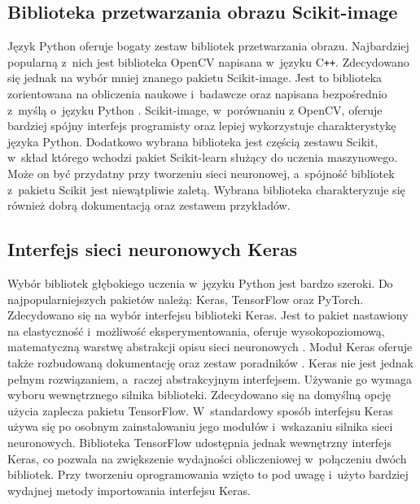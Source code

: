 \subsection{Biblioteka przetwarzania obrazu Scikit-image}
Język Python oferuje bogaty zestaw bibliotek przetwarzania obrazu.
Najbardziej popularną z~nich jest biblioteka OpenCV napisana w~języku
C\texttt{++}.
Zdecydowano się jednak na wybór mniej znanego pakietu Scikit-image.
Jest to biblioteka zorientowana na obliczenia naukowe i~badawcze oraz napisana
bezpośrednio z~myślą o~języku Python \cite{scikit-image}.
Scikit-image, w~porównaniu z OpenCV, oferuje bardziej spójny interfejs
programisty oraz lepiej wykorzystuje charakterystykę języka Python.
Dodatkowo wybrana biblioteka jest częścią zestawu Scikit, w~skład którego
wchodzi pakiet Scikit-learn służący do uczenia maszynowego.
Może on być przydatny przy tworzeniu sieci neuronowej, a~spójność bibliotek
z~pakietu Scikit jest niewątpliwie zaletą.
Wybrana biblioteka charakteryzuje się również dobrą dokumentacją
\cite{scikit_reference} oraz zestawem przykładów.

\subsection{Interfejs sieci neuronowych Keras}
\label{subsec:software_network}
Wybór bibliotek głębokiego uczenia w~języku Python jest bardzo szeroki.
Do najpopularniejszych pakietów należą: Keras, TensorFlow oraz PyTorch.
Zdecydowano się na wybór interfejsu biblioteki Keras.
Jest to pakiet nastawiony na elastyczność i~możliwość eksperymentowania, oferuje
wysokopoziomową, matematyczną warstwę abstrakcji opisu sieci
neuronowych \cite{chollet_keras}.
Moduł Keras oferuje także rozbudowaną dokumentację oraz zestaw poradników
\cite{keras_docs}.
Keras nie jest jednak pełnym rozwiązaniem, a~raczej abstrakcyjnym interfejsem.
Używanie go wymaga wyboru wewnętrznego silnika biblioteki.
Zdecydowano się na domyślną opcję użycia zaplecza pakietu TensorFlow.
W~standardowy sposób interfejsu Keras używa się po osobnym zainstalowaniu jego
modułów i~wskazaniu silnika sieci neuronowych.
Biblioteka TensorFlow udostępnia jednak wewnętrzny interfejs Keras, co pozwala
na zwiększenie wydajności obliczeniowej w~połączeniu dwóch bibliotek.
Przy tworzeniu oprogramowania wzięto to pod uwagę i~użyto bardziej wydajnej
metody importowania interfejsu Keras.
